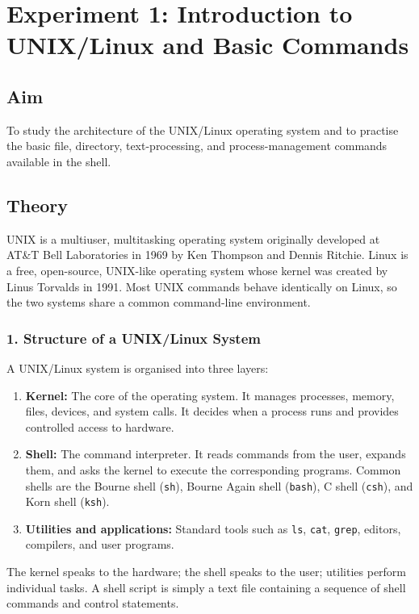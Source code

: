 \section{Experiment 1: Introduction to UNIX/Linux and Basic Commands}
\label{exp:unix}

\subsection*{Aim}
To study the architecture of the UNIX/Linux operating system and to practise the basic file, directory, text-processing, and process-management commands available in the shell.

\subsection*{Theory}
UNIX is a multiuser, multitasking operating system originally developed at AT\&T Bell Laboratories in 1969 by Ken Thompson and Dennis Ritchie. Linux is a free, open-source, UNIX-like operating system whose kernel was created by Linus Torvalds in 1991. Most UNIX commands behave identically on Linux, so the two systems share a common command-line environment.

\subsubsection*{1. Structure of a UNIX/Linux System}
A UNIX/Linux system is organised into three layers:
\begin{enumerate}
    \item \textbf{Kernel:} The core of the operating system. It manages processes, memory, files, devices, and system calls. It decides when a process runs and provides controlled access to hardware.
    \item \textbf{Shell:} The command interpreter. It reads commands from the user, expands them, and asks the kernel to execute the corresponding programs. Common shells are the Bourne shell (\texttt{sh}), Bourne Again shell (\texttt{bash}), C shell (\texttt{csh}), and Korn shell (\texttt{ksh}).
    \item \textbf{Utilities and applications:} Standard tools such as \texttt{ls}, \texttt{cat}, \texttt{grep}, editors, compilers, and user programs.
\end{enumerate}

\begin{infobox}
The kernel speaks to the hardware; the shell speaks to the user; utilities perform individual tasks. A shell script is simply a text file containing a sequence of shell commands and control statements.
\end{infobox}

